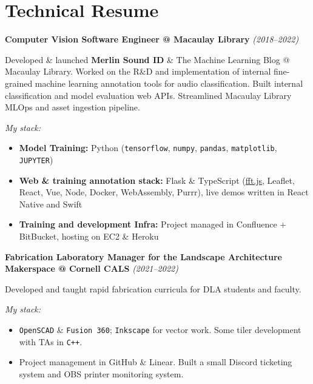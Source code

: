 \documentclass[11pt,letterpaper]{article}
\newcommand{\role}[2]{%
    \noindent\textbf{\color{secondary}#1} \hfill \textit{\color{muted}(#2)}\par\vspace{0.3em}
}
\newcommand{\tech}[1]{\texttt{\small\color{secondary}#1}}
\newcommand{\cvlink}[2]{\href{#1}{\color{linkcolor}#2}}
\begin{document}
\section{Technical Resume}
\label{sec:resume}

\role{Computer Vision Software Engineer @ Macaulay Library}{2018--2022}

Developed \& launched \textbf{Merlin Sound ID} \& The Machine Learning Blog @ Macaulay Library. Worked on the R\&D and implementation of internal fine-grained machine learning annotation tools for audio classification. Built internal classification and model evaluation web APIs. Streamlined Macaulay Library MLOps and asset ingestion pipeline.

\vspace{0.5em}
\noindent\textit{\color{muted}My stack:}
\begin{itemize}
    \item \textbf{Model Training:} Python (\tech{tensorflow}, \tech{numpy}, \tech{pandas}, \tech{matplotlib}, \tech{JUPYTER})
    \item \textbf{Web \& training annotation stack:} Flask \& TypeScript (\cvlink{https://github.com/indutny/fft.js}{fft.js}, Leaflet, React, Vue, Node, Docker, WebAssembly, Purrr), live demos written in React Native and Swift
    \item \textbf{Training and development Infra:} Project managed in Confluence + BitBucket, hosting on EC2 \& Heroku
\end{itemize}

\vspace{0.8em}

\role{Fabrication Laboratory Manager for the Landscape Architecture Makerspace @ Cornell CALS}{2021--2022}

Developed and taught rapid fabrication curricula for DLA students and faculty.

\vspace{0.5em}
\noindent\textit{\color{muted}My stack:}
\begin{itemize}
    \item \tech{OpenSCAD} \& \tech{Fusion 360}; \tech{Inkscape} for vector work. Some tiler development with TAs in \tech{C++}.
    \item Project management in GitHub \& Linear. Built a small Discord ticketing system and OBS printer monitoring system.
\end{itemize}

\vspace{0.8em}
\end{document}
